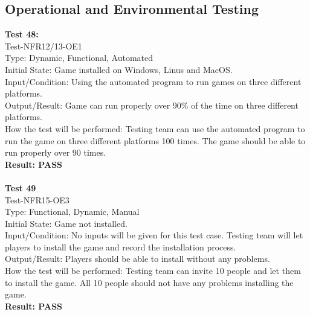 \documentclass[12pt, titlepage]{article}
\begin{document}
\subsection{Operational and Environmental Testing}
\textbf{Test 48:}\\
Test-NFR12/13-OE1\\
Type: Dynamic, Functional, Automated\\
Initial State: Game installed on Windows, Linus and MacOS.\\
Input/Condition: Using the automated program to run games
on three different platforms.\\
Output/Result: Game can run properly over 90\% of the time on three different platforms.\\
How the test will be performed: Testing team can use
 the automated program to run the game on three different 
 platforms 100 times. The game should be able to run 
 properly over 90 times.\\
 \textbf{Result: PASS}\\\\
\textbf{Test 49}\\
 Test-NFR15-OE3\\
Type: Functional, Dynamic, Manual\\
Initial State: Game not installed.\\
Input/Condition: No inputs will be given for this test 
case. Testing team will let players to install the game
and record the installation 
process.\\
Output/Result: Players should be able to install without
any problems.\\
How the test will be performed: Testing team can 
invite 10 people and let them to install the game. All
10 people should not have any problems installing the 
game.\\
\textbf{Result: PASS}\\\\
\end{document}
